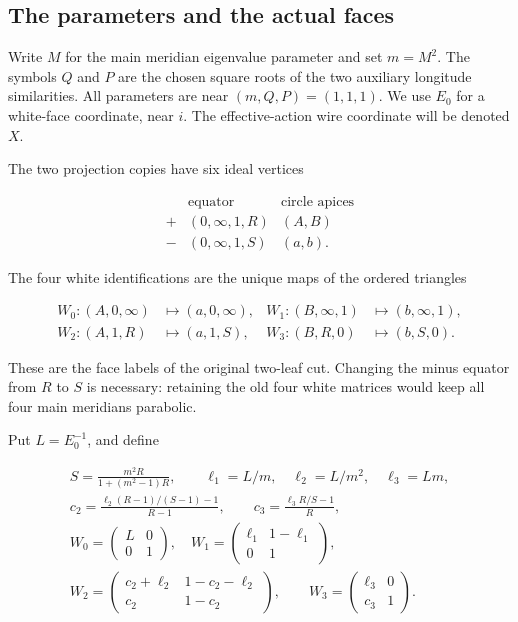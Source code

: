 \subsection{The parameters and the actual faces}\label{gi:the-parameters-and-the-actual-faces}

Write \(M\) for the main meridian eigenvalue parameter and set
\(m=M^2\). The symbols \(Q\) and \(P\) are the chosen square roots
of the two auxiliary longitude similarities. All parameters are near
\((m,Q,P)=(1,1,1)\). We use \(E_0\) for a white-face
coordinate, near \(i\). The effective-action wire coordinate will be
denoted \(X\).

The two projection copies have six ideal vertices

\begin{equation}\label{gi:N1}
\begin{array}{c|c|c}
 &\text{equator}&\text{circle apices}\\ \hline
 +&(0,\infty,1,R)&(A,B)\\
 -&(0,\infty,1,S)&(a,b).
 \end{array}
\end{equation}

The four white identifications are the unique maps of the ordered
triangles

\begin{equation}\label{gi:N2}
\begin{aligned}
 W_0:(A,0,\infty)&\longmapsto(a,0,\infty),&
 W_1:(B,\infty,1)&\longmapsto(b,\infty,1),\\
 W_2:(A,1,R)&\longmapsto(a,1,S),&
 W_3:(B,R,0)&\longmapsto(b,S,0).
\end{aligned}
\end{equation}

These are the face labels of the original two-leaf cut. Changing the
minus equator from \(R\) to \(S\) is necessary: retaining the old
four white matrices would keep all four main meridians parabolic.

Put \(L=E_0^{-1}\), and define

\begin{equation}\label{gi:N3}
\begin{gathered}
 S=\frac{m^2R}{1+(m^2-1)R},\qquad
 \ell_1=L/m,\quad \ell_2=L/m^2,\quad \ell_3=Lm,\\
 c_2=\frac{\ell_2(R-1)/(S-1)-1}{R-1},\qquad
 c_3=\frac{\ell_3R/S-1}{R},\\
 W_0=\begin{pmatrix}L&0\\0&1\end{pmatrix},\quad
 W_1=\begin{pmatrix}\ell_1&1-\ell_1\\0&1\end{pmatrix},\\
 W_2=\begin{pmatrix}c_2+\ell_2&1-c_2-\ell_2\\c_2&1-c_2\end{pmatrix},
 \qquad
 W_3=\begin{pmatrix}\ell_3&0\\c_3&1\end{pmatrix}.
\end{gathered}
\end{equation}

